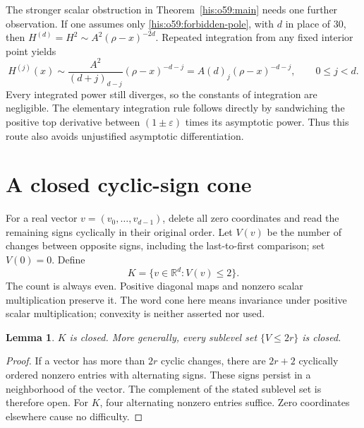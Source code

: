 \documentclass[11pt]{article}
\newtheorem{lemma}[theorem]{Lemma}
\theoremstyle{remark}\newtheorem{remark}[theorem]{Remark}
\newcommand{\eps}{\varepsilon}
\newcommand{\R}{\mathbb R}
\numberwithin{equation}{section}
\begin{document}
The stronger scalar obstruction in Theorem~\ref{his:o59:main} needs one further
observation. If one assumes only \eqref{his:o59:forbidden-pole}, with $d$ in
place of $30$, then $H^{(d)}=H^2\sim A^2(\rho-x)^{-2d}$.
Repeated integration from any fixed interior point yields
\begin{equation}\label{his:o59:integration-limits}
H^{(j)}(x)\sim
\frac{A^2}{(d+j)_{d-j}}(\rho-x)^{-d-j}
=A(d)_j(\rho-x)^{-d-j},\qquad 0\le j<d.
\end{equation}
Every integrated power still diverges, so the constants of integration
are negligible. The elementary integration rule follows directly by
sandwiching the positive top derivative between $(1\pm\eps)$ times
its asymptotic power. Thus this route also avoids unjustified
asymptotic differentiation.

\section{A closed cyclic-sign cone}
For a real vector $v=(v_0,\ldots,v_{d-1})$, delete all zero coordinates
and read the remaining signs cyclically in their original order.
Let $V(v)$ be the number of changes between opposite signs, including
the last-to-first comparison; set $V(0)=0$. Define
\begin{equation}\label{his:o59:cone}
K=\{v\in\R^d:V(v)\le2\}.
\end{equation}
The count is always even. Positive diagonal maps and nonzero scalar
multiplication preserve it. The word cone here means invariance under
positive scalar multiplication; convexity is neither asserted nor used.

\begin{lemma}\label{his:o59:closed}
$K$ is closed. More generally, every sublevel set $\{V\le2r\}$ is closed.
\end{lemma}
\begin{proof}
If a vector has more than $2r$ cyclic changes, there are $2r+2$
cyclically ordered nonzero entries with alternating signs. These signs
persist in a neighborhood of the vector. The complement of the stated
sublevel set is therefore open. For $K$, four alternating nonzero
entries suffice. Zero coordinates elsewhere cause no difficulty.
\end{proof}
\end{document}

